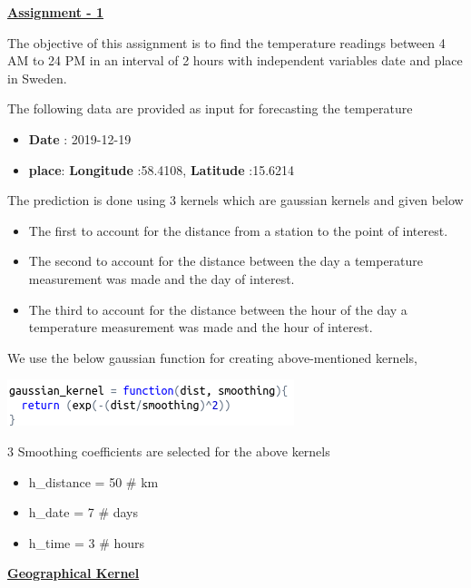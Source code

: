 \documentclass[a4paper,10pt]{article}
\begin{document}
\textbf{\underline{Assignment - 1}} \par
The objective of this assignment is to find the temperature readings between 4 AM to 24 PM in an interval of 2 hours with independent variables
date and  place in Sweden. \par
The following data are provided as input for forecasting the temperature
\begin{itemize}
  \item \textbf{Date} : 2019-12-19
  \item \textbf{place}: \textbf{Longitude} :58.4108, \textbf{Latitude} :15.6214
\end{itemize}
The prediction is done using 3 kernels which are gaussian kernels and given below
\begin{itemize}
  \item The first to account for the distance from a station to the point of interest.
  \item The second to account for the distance between the day a temperature measurement was made and the day of interest.
  \item The third to account for the distance between the hour of the day a temperature measurement was made and the hour of interest.
\end{itemize} \par 
We use the below gaussian function for creating above-mentioned kernels,
\begin{center}
  \includegraphics{gaussian_Kernel}
\end{center}
3 Smoothing coefficients are selected for the above kernels 
\begin{itemize}
  \item h\_distance = 50  \# km
  \item h\_date = 7 \# days
  \item h\_time = 3 \# hours
\end{itemize}
\textbf{\underline{Geographical Kernel}} \par
\end{document}
